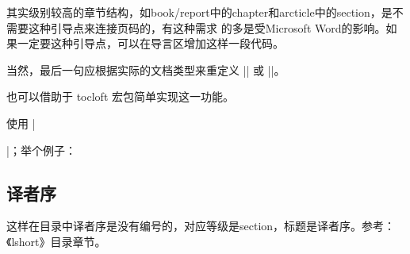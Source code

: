 

其实级别较高的章节结构，如book/report中的chapter和arcticle中的section，是不需要这种引导点来连接页码的，有这种需求
的多是受Microsoft Word的影响。如果一定要这种引导点，可以在导言区增加这样一段代码。
\begin{texlist}
  \makeatletter
  \def\@bfdottedtocline#1#2#3#4#5{%
  \ifnum #1>\c@tocdepth \else
  \vskip \z@ \@plus.2\p@
  {\leftskip #2\relax \rightskip \@tocrmarg \parfillskip -\rightskip
  \parindent #2\relax\@afterindenttrue
  \interlinepenalty\@M
  \leavevmode \bfseries
  \@tempdima #3\relax
  \advance\leftskip \@tempdima \null\nobreak\hskip -\leftskip
  {#4}\normalfont\nobreak
  \leaders\hbox{$\m@th
  \mkern \@dotsep mu\hbox{.}\mkern \@dotsep
  mu$}\hfill
  \nobreak
  \hb@xt@\@pnumwidth{\hfil\normalfont \normalcolor #5}%
  \par}%
  \fi}
  \renewcommand*\l@section{\@bfdottedtocline{0}{0em}{1.5em}}
  \makeatother
\end{texlist}
当然，最后一句应根据实际的文档类型来重定义 |\l@chapter| 或 |\l@section|。

也可以借助于 tocloft 宏包简单实现这一功能。
\begin{texlist}
\usepackage{tocloft}
\renewcommand{\cftsecleader}{\cftdotfill{\cftdotsep}} %
\end{texlist}





使用 ||；举个例子：
\begin{texlist}
  \section*{译者序}
\end{texlist}
这样在目录中译者序是没有编号的，对应等级是section，标题是译者序。参考：《lshort》目录章节。


